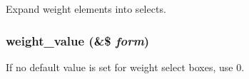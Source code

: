 Expand weight elements into selects. \hypertarget{group__form__api_gd80eba4897b841808cb71e6ba97603b2}{
\subsubsection[{weight\_\-value}]{\setlength{\rightskip}{0pt plus 5cm}weight\_\-value (\&\$ {\em form})}}
\label{group__form__api_gd80eba4897b841808cb71e6ba97603b2}


If no default value is set for weight select boxes, use 0. 